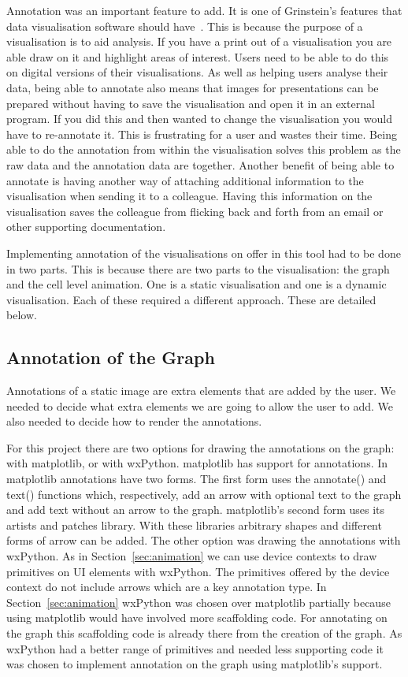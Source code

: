 Annotation was an important feature to add.  It is one of Grinstein's features that data visualisation software should have~\cite{gg_vizbi}.  This is because the purpose of a visualisation is to aid analysis.  If you have a print out of a visualisation you are able draw on it and highlight areas of interest.  Users need to be able to do this on digital versions of their visualisations.  As well as helping users analyse their data, being able to annotate also means that images for presentations can be prepared without having to save the visualisation and open it in an external program.  If you did this and then wanted to change the visualisation you would have to re-annotate it.  This is frustrating for a user and wastes their time.  Being able to do the annotation from within the visualisation solves this problem as the raw data and the annotation data are together.  Another benefit of being able to annotate is having another way of attaching additional information to the visualisation when sending it to a colleague. Having this information on the visualisation saves the colleague from flicking back and forth from an email or other supporting documentation.

Implementing annotation of the visualisations on offer in this tool had to be done in two parts.  This is because there are two parts to the visualisation:  the graph and the cell level animation.  One is a static visualisation and one is a dynamic visualisation.  Each of these required a different approach.  These are detailed below.

\subsection{Annotation of the Graph}
\label{sec:annotation_graph}

Annotations of a static image are extra elements that are added by the user.  We needed to decide what extra elements we are going to allow the user to add.  We also needed to decide how to render the annotations.

For this project there are two options for drawing the annotations on the graph: with matplotlib, or with wxPython.  matplotlib has support for annotations.  In matplotlib annotations have two forms. The first form uses the annotate() and text() functions which, respectively, add an arrow with optional text to the graph and add text without an arrow to the graph.  matplotlib's second form uses its artists and patches library.  With these libraries arbitrary shapes and different forms of arrow can be added.  The other option was drawing the annotations with wxPython.  As in Section~\ref{sec:animation} we can use device contexts to draw primitives on \ac{UI} elements with wxPython.  The primitives offered by the device context do not include arrows which are a key annotation type.  In Section~\ref{sec:animation} wxPython was chosen over matplotlib partially because using matplotlib would have involved more scaffolding code.  For annotating on the graph this scaffolding code is already there from the creation of the graph.  As wxPython had a better range of primitives and needed less supporting code it was chosen to implement annotation on the graph using matplotlib's support.

